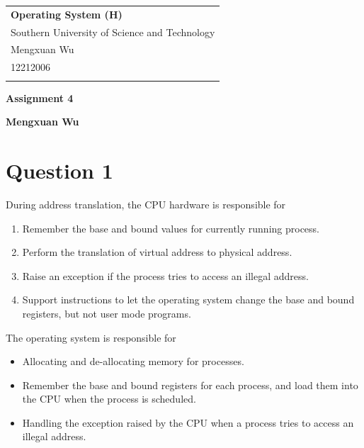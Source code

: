 \documentclass[a4paper,12pt]{article}
\begin{document}
\thispagestyle{empty} %

\begin{tabular}{p{15.5cm}}
{\large \bf Operating System (H)} \\
Southern University of Science and Technology \\ Mengxuan Wu \\ 12212006 \\
\hline
\\
\end{tabular}

\vspace*{0.3cm} %

\begin{center}
	{\Large \bf Assignment 4}
	\vspace{2mm}

	{\bf Mengxuan Wu}
		
\end{center}  

\vspace{0.4cm}

\section*{Question 1}

During address translation, the CPU hardware is responsible for
\begin{enumerate}
	\item Remember the base and bound values for currently running process.
	\item Perform the translation of virtual address to physical address.
	\item Raise an exception if the process tries to access an illegal address.
	\item Support instructions to let the operating system change the base and bound registers, but not user mode programs.
\end{enumerate}

The operating system is responsible for
\begin{itemize}
	\item Allocating and de-allocating memory for processes.
	\item Remember the base and bound registers for each process, and load them into the CPU when the process is scheduled.
	\item Handling the exception raised by the CPU when a process tries to access an illegal address.
\end{itemize}
\end{document}
